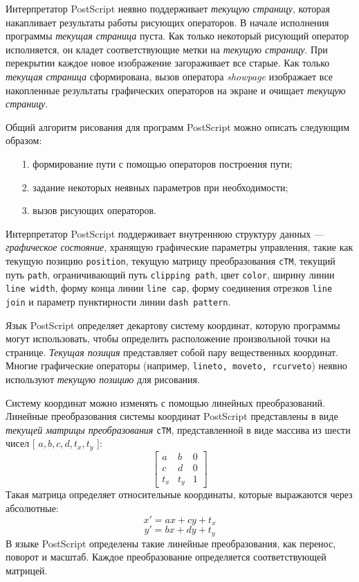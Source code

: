 \documentclass[14pt]{extarticle}
\begin{document}
Интерпретатор PostScript неявно поддерживает \textit{текущую страницу}, которая накапливает результаты работы рисующих операторов. В начале исполнения программы \textit{текущая страница} пуста. Как только некоторый рисующий оператор исполняется, он кладет соответствующие метки на \textit{текущую страницу}. При перекрытии каждое новое изображение загораживает все старые. Как только \textit{текущая страница} сформирована, вызов оператора \textit{showpage} изображает все накопленные результаты графических операторов на экране и очищает \textit{текущую страницу}.

Общий алгоритм рисования для программ PostScript можно описать следующим образом:

\begin{itemize}
\item [1. ] формирование пути с помощью операторов построения пути;
\item [2. ] задание некоторых неявных параметров при необходимости;
\item [3. ] вызов рисующих операторов.
\end{itemize} 



Интерпретатор PostScript поддерживает внутреннюю структуру данных --- \textit{графическое состояние}, хранящую графические параметры управления, такие как текущую позицию \texttt{position}, текущую матрицу преобразования \texttt{cTM}, текущий путь \texttt{path}, ограничивающий путь \texttt{clipping path}, цвет \texttt{color}, ширину линии \texttt{line width}, форму конца линии \texttt{line cap}, форму соединения отрезков \texttt{line join} и параметр пунктирности линии \texttt{dash pattern}.


Язык PostScript определяет декартову систему координат, которую программы могут использовать, чтобы определить расположение произвольной точки на странице.  
\textit{Текущая позиция} представляет собой пару вещественных координат. Многие графические операторы (например, \texttt{lineto, moveto, rcurveto}) неявно используют \textit{текущую позицию} для рисования.

Систему координат можно изменять с помощью линейных преобразований. Линейные преобразования системы координат PostScript представлены в виде \textit{текущей матрицы преобразования} \texttt{cTM}, представленной в виде массива из шести чисел [ $a, b, c, d, t_x, t_y$ ]:
\[
\begin{bmatrix}
a & b & 0 \\ c & d & 0 \\ t_x & t_y & 1
\end{bmatrix}
\]
Такая матрица определяет относительные координаты, которые выражаются через абсолютные:
$$ x' = ax + cy + t_x $$
$$   y' = bx + dy + t_y $$ 
В языке PostScript определены такие линейные преобразования, как перенос, поворот и масштаб. Каждое преобразование определяется соответствующей матрицей. 
\end{document}
